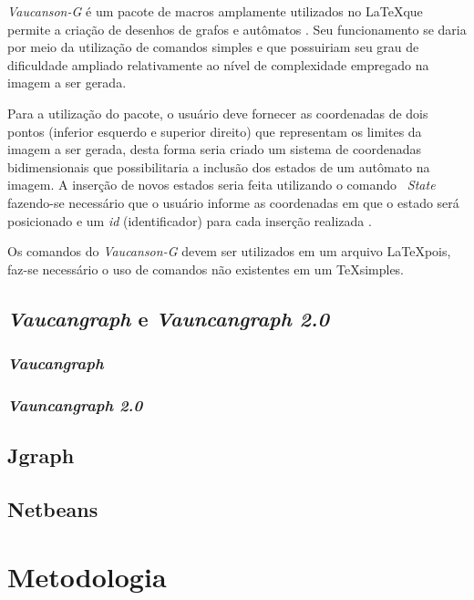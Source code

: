 \documentclass[a4paper,12pt,portuguese]{ufms-cpcx}
\begin{document}
\textit {Vaucanson-G} é um pacote de macros amplamente utilizados no \LaTeX que permite a criação de desenhos de grafos e autômatos \cite{lombardy2008vaucanson}. Seu funcionamento se daria por meio da utilização de comandos simples e que possuiriam seu grau de dificuldade ampliado relativamente ao nível de complexidade empregado na imagem a ser gerada. 

Para a utilização do pacote, o usuário deve fornecer as coordenadas de dois pontos (inferior esquerdo e superior direito) que representam os limites da imagem a ser gerada, desta forma seria criado um sistema de coordenadas bidimensionais que possibilitaria a inclusão dos estados de um autômato na imagem. A inserção de novos estados seria feita utilizando o comando \textit{ \ State} fazendo-se necessário que o usuário informe as coordenadas em que o estado será posicionado e um \textit{id} (identificador) para cada inserção realizada \cite{dainteractive}. 

Os comandos do \textit {Vaucanson-G} devem ser utilizados em um arquivo \LaTeX pois, faz-se necessário o uso de comandos não existentes em um \TeX simples.

\section{\textit{Vaucangraph} e \textit{Vauncangraph 2.0}} %

\subsection{\textit{Vaucangraph}}

\subsection{\textit{Vauncangraph 2.0}}

\section{ Jgraph} %

\section{ Netbeans} %

\chapter{Metodologia} \label{cap: metodologia}
\end{document}
